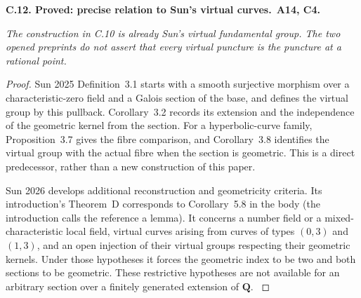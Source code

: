 \documentclass[11pt,a4paper]{article}
\newcommand{\Q}{\mathbf Q}
\newenvironment{claim}[3]{\par\medskip\noindent\hypertarget{#1}{\textbf{#1. #2.}}\ \textbf{#3.}\par\nopagebreak\smallskip\begingroup\itshape}{\endgroup\par\smallskip}
\begin{document}
\begin{claim}{C.12}{Proved: precise relation to Sun's virtual curves}{A14, C4}
The construction in C.10 is already Sun's virtual fundamental group.
The two opened preprints do not assert that every virtual puncture is
the puncture at a rational point.
\end{claim}
\begin{proof}
Sun 2025 Definition~3.1 starts with a smooth surjective morphism over
a characteristic-zero field and a Galois section of the base, and defines
the virtual group by this pullback. Corollary~3.2 records its extension
and the independence of the geometric kernel from the section.
For a hyperbolic-curve family, Proposition~3.7 gives the fibre comparison,
and Corollary~3.8 identifies the virtual group with the actual fibre
when the section is geometric. This is a direct predecessor, rather
than a new construction of this paper.

Sun 2026 develops additional reconstruction and geometricity criteria.
Its introduction's Theorem~D corresponds to Corollary~5.8 in the body
(the introduction calls the reference a lemma). It concerns a number
field or a mixed-characteristic local field, virtual curves arising
from curves of types $(0,3)$ and $(1,3)$, and an open injection of their
virtual groups respecting their geometric kernels. Under those
hypotheses it forces the geometric index to be two and both sections
to be geometric. These restrictive hypotheses are not available for
an arbitrary section over a finitely generated extension of $\Q$.
\citep[Definition~3.1, Corollary~3.2, Proposition~3.7 and
Corollary~3.8]{LA_Sun2025}
\citep[Theorem~D and Corollary~5.8]{LA_Sun2026}
\end{proof}
\end{document}
